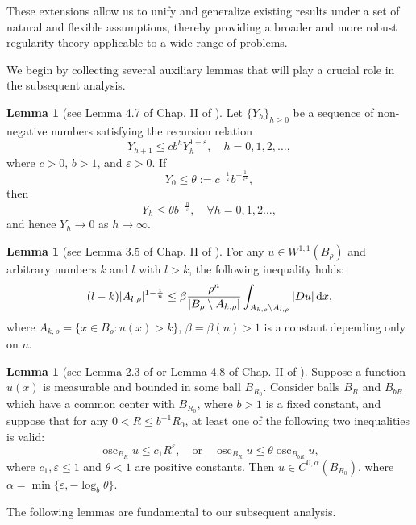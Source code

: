 \documentclass[10pt,reqno]{amsart}
\newcommand *\w{^\wedge}
\theoremstyle{definition}
\newtheorem{lemma}[theorem]{Lemma}
\numberwithin{equation}{section}
\begin{document}
These extensions allow us to unify and generalize existing results under a set of natural and flexible assumptions, thereby providing a broader and more robust regularity theory applicable to a wide range of problems.

We begin by collecting several auxiliary lemmas that will play a crucial role in the subsequent analysis.

\begin{lemma}[see Lemma 4.7 of Chap. II of \cite{OL}]\label{Lemma 2.1}
Let $\{Y_h\}_{h\geq 0}$ be a sequence of non-negative numbers satisfying the recursion relation
\[
Y_{h+1} \leq c b^h Y_h^{1+\varepsilon}, \quad h = 0, 1, 2, \dots,
\]
where $c > 0$, $b > 1$, and $\varepsilon > 0$. If
\[
Y_0 \leq \theta := c^{-\frac{1}{\varepsilon}} b^{-\frac{1}{\varepsilon^2}},
\]
then
\[
Y_h \leq \theta b^{-\frac{h}{\varepsilon}}, \quad \forall h =0,1,2\ldots,
\]
and hence $Y_h \to 0$ as $h \to \infty$.
\end{lemma}

\begin{lemma}[see Lemma 3.5 of Chap. II of \cite{OL}]\label{Lemma 2.2}
For any \(u \in W^{1,1}(B_\rho)\) and arbitrary numbers \(k\) and \(l\) with \(l > k\), the following inequality hol{\rm d}s:
\begin{equation}\label{2.2}
(l - k)|A_{l,\rho}|^{1-\frac{1}{n}} \leq \beta \frac{\rho^n}{|B_\rho \setminus A_{k,\rho}|} \int_{A_{k,\rho}\setminus A_{l,\rho}} |Du| \, {\rm d}x,
\end{equation}
where \(A_{k,\rho} = \{x \in B_\rho : u(x) > k\}\), \(\beta = \beta(n) > 1\) is a constant depending only on \(n\).
\end{lemma}

\begin{lemma}[see Lemma 2.3 of \cite{Fan1999} or Lemma 4.8 of Chap. II of \cite{OL}]\label{Lemma 2.3}
Suppose a function \(u(x)\) is measurable and bounded in some ball \(B_{R_0}\). Consider balls \(B_R\) and \(B_{bR}\) which have a common center with \(B_{R_0}\), where \(b > 1\) is a fixed constant, and suppose that for any \(0 < R \leq b^{-1} R_0\), at least one of the following two inequalities is valid:
\[
\operatorname{osc}_{B_R}u \leq c_1 R^\varepsilon, \quad \text{or}\quad \operatorname{osc}_{B_R}u \leq \theta \operatorname{osc}_{ B_{bR}}u,
\]
where \(c_1, \varepsilon \leq 1\) and \(\theta < 1\) are positive constants. Then \(u \in C^{0,\alpha}(B_{R_0})\), where \(\alpha = \min\{\varepsilon, -\log_b \theta\}\).
\end{lemma}
The following lemmas are fundamental to our subsequent analysis.
\end{document}
